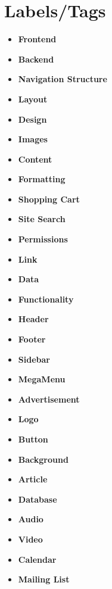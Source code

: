 \documentclass[10pt, oneside, letterpaper]{apa6e}
\begin{document}
\section{Labels/Tags}
\begin{itemize}
    \item \textbf{Frontend}
    \item \textbf{Backend}
    \item \textbf{Navigation Structure}
    \item \textbf{Layout}
    \item \textbf{Design}
    \item \textbf{Images}
    \item \textbf{Content}
    \item \textbf{Formatting}
    \item \textbf{Shopping Cart}
    \item \textbf{Site Search}
    \item \textbf{Permissions}
    \item \textbf{Link}
    \item \textbf{Data}
    \item \textbf{Functionality}
    \item \textbf{Header}
    \item \textbf{Footer}
    \item \textbf{Sidebar}
    \item \textbf{MegaMenu}
    \item \textbf{Advertisement}
    \item \textbf{Logo}
    \item \textbf{Button}
    \item \textbf{Background}
    \item \textbf{Article}
    \item \textbf{Database}
    \item \textbf{Audio}
    \item \textbf{Video}
    \item \textbf{Calendar}
    \item \textbf{Mailing List}
\end{itemize}
\end{document}
